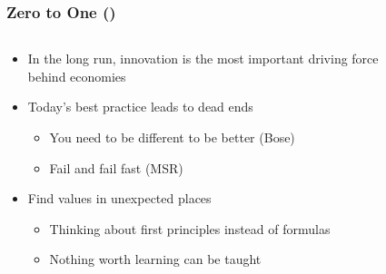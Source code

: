 \documentclass[aspectratio=169,xcolor=x11names,table]{beamer}
\begin{document}
\begin{frame}
	\frametitle{Zero to One (\cite{thiel2014zero})}
	\begin{columns}
		\begin{column}{0.7\linewidth}
			\begin{itemize}
				\item In the long run, innovation is the most important driving force behind economies
				\item Today's best practice leads to dead ends
					\begin{itemize}
						\item You need to be different to be better (Bose)
						\item Fail and fail fast (MSR)
					\end{itemize}
				\item Find values in unexpected places
					\begin{itemize}
						\item Thinking about first principles instead of formulas
						\item Nothing worth learning can be taught
					\end{itemize}
			\end{itemize}
		\end{column}
		\hfill
		\begin{column}{0.3\linewidth}
			\begin{figure}
				\centering

\end{figure}
\end{column}
\end{columns}
\end{frame}
\end{document}
